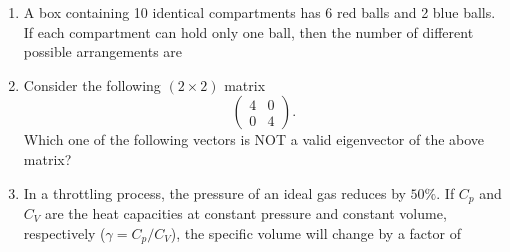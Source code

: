 \documentclass[journal,12pt,onecolumn]{IEEEtran}
\theoremstyle{remark}
\begin{document}
\begin{enumerate}
\item A box containing 10 identical compartments has 6 red balls and 2 blue balls. If each compartment can hold only one ball, then the number of different possible arrangements are
\hfill{}
\begin{enumerate}
\end{enumerate}

\item Consider the following $(2\times 2)$ matrix
\[\begin{pmatrix}4 & 0 \\0 & 4\end{pmatrix}.\]
Which one of the following vectors is NOT a valid eigenvector of the above matrix?
\hfill{}
\begin{enumerate}
\end{enumerate}

\item In a throttling process, the pressure of an ideal gas reduces by $50\%$. If $C_p$ and $C_V$ are the heat capacities at constant pressure and constant volume, respectively ($\gamma = C_p/C_V$), the specific volume will change by a factor of
\hfill{}
\begin{enumerate}
\end{enumerate}


\end{enumerate}
\end{document}
